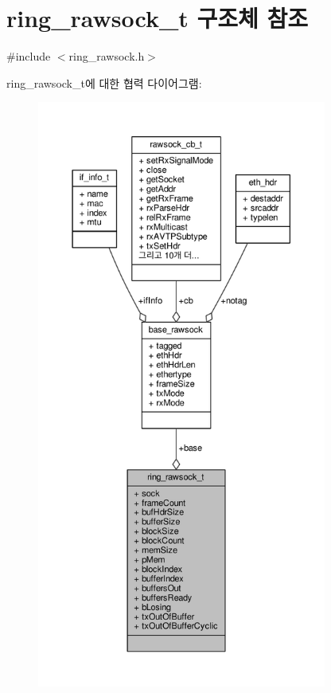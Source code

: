 \hypertarget{structring__rawsock__t}{}\section{ring\+\_\+rawsock\+\_\+t 구조체 참조}
\label{structring__rawsock__t}


{\ttfamily \#include $<$ring\+\_\+rawsock.\+h$>$}



ring\+\_\+rawsock\+\_\+t에 대한 협력 다이어그램\+:
\nopagebreak
\begin{figure}[H]
\begin{center}
\leavevmode
\includegraphics[height=550pt]{structring__rawsock__t__coll__graph}
\end{center}
\end{figure}
